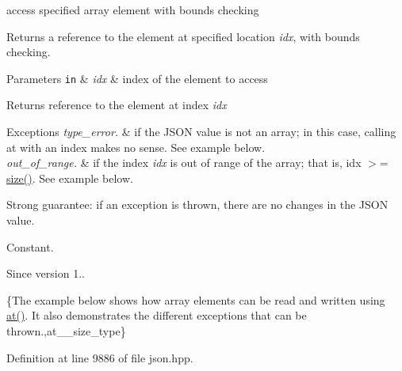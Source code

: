 access specified array element with bounds checking 

Returns a reference to the element at specified location {\itshape idx}, with bounds checking.


\begin{DoxyParams}[1]{Parameters}
\mbox{\tt in}  & {\em idx} & index of the element to access\\
\hline
\end{DoxyParams}
\begin{DoxyReturn}{Returns}
reference to the element at index {\itshape idx} 
\end{DoxyReturn}

\begin{DoxyExceptions}{Exceptions}
{\em type\+\_\+error.} & if the J\+S\+ON value is not an array; in this case, calling {\ttfamily at} with an index makes no sense. See example below. \\
\hline
{\em out\+\_\+of\+\_\+range.} & if the index {\itshape idx} is out of range of the array; that is, {\ttfamily idx $>$= \hyperlink{classnlohmann_1_1basic__json_a25e27ad0c6d53c01871c5485e1f75b96}{size()}}. See example below.\\
\hline
\end{DoxyExceptions}
Strong guarantee\+: if an exception is thrown, there are no changes in the J\+S\+ON value.

Constant.

\begin{DoxySince}{Since}
version 1..
\end{DoxySince}
\{The example below shows how array elements can be read and written using {\ttfamily \hyperlink{classnlohmann_1_1basic__json_a73ae333487310e3302135189ce8ff5d8}{at()}}. It also demonstrates the different exceptions that can be thrown.,at\+\_\+\+\_\+size\+\_\+type\} 

Definition at line 9886 of file json.\+hpp.

